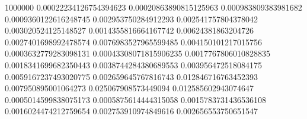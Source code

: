 {1000000 0.00022234126754394623 0.00020863890815125963 0.000983809383981682 0.0009360122616248745 0.002953750284912293 0.002541757804378042 0.003020524125148527 0.0014355816664167742 0.00624381863204726 0.0027401698992478574 0.0076983527965599485 0.004150101217015756 0.0003632779283098131 0.00043308071815906235 0.0017767806010828835 0.0018341699682350443 0.0038744284380689553 0.003956472518084175 0.0059167237493020775 0.002659645767816743 0.012846716763452393 0.007950895001064273 0.025067908573449094 0.012585602943074647 0.0005014599838075173 0.0005875614444315058 0.0015783731436536108 0.0016024474212759654 0.002753910974849616 0.002656553750651547
}\dataA


